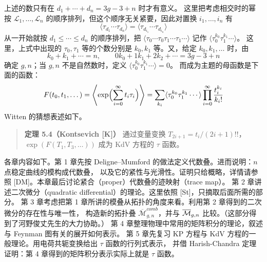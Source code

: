 
上述的数只有在 $d_1+\cdots+d_n=3g-3+n$ 时才有意义。
这里把考虑相交时的幂按 $\mathcal{L}_1,\dots,\mathcal{L}_n$ 的顺序排列，但这个顺序无关紧要，因此对置换 $i_1,\dots,i_n$ 有
\[
\langle\tau_{d_1}\cdots\tau_{d_n}\rangle=\langle\tau_{d_{i_1}}\cdots\tau_{d_{i_n}}\rangle
\]
从一开始就按 $d_1\le\cdots\le d_n$ 的顺序排列，把
$\langle\tau_0\cdots\tau_0\tau_1\cdots\tau_1\cdots\rangle$ 记作 $\langle\tau_0^{k_0}\tau_1^{k_1}\cdots\rangle$。
这里，上式中出现的 $\tau_0,\tau_1$ 等的个数分别是 $k_0,k_1$ 等。又，给定 $k_0,k_1,\dots$ 时，由
\[
k_0+k_1+\cdots=n,\qquad 0k_0+1k_1+2k_2+\cdots=3g-3+n
\]
确定 $g,n$；当 $g,n$ 不是自然数时，定义 $\langle\tau_0^{k_0}\tau_1^{k_1}\cdots\rangle=0$。
而成为主题的母函数是下面的函数：
\[
F(t_0,t_1,\dots)=\left\langle\exp\Bigl(\sum_{i=0}^{\infty}t_i\tau_i\Bigr)\right\rangle
=\sum_{k_i}\langle\tau_0^{k_0}\tau_1^{k_1}\cdots\rangle\prod_{i=0}^{\infty}\frac{t_i^{k_i}}{k_i!}
\]
Witten 的猜想表述如下。

\begin{quote}
\textbf{定理 5.4（Kontsevich [K]）}\quad
通过变量变换 $T_{2i+1}=t_i/(2i+1)!!$，$\exp(F(T_1,T_3,\dots))$ 成为 KdV 方程的 $\tau$ 函数。
\end{quote}


各章内容如下。第 1 章先按 Deligne--Mumford 的做法定义代数叠。进而说明：$n$ 点稳定曲线的模构成代数叠，
以及它的紧性与光滑性。证明只给概略，详情请参照 [DM]。本章最后讨论紧合（proper）代数叠的迹映射（trace map）。
第 2 章讲述二次微分（quadratic differential）的理论。这里依照 [St]，只摘取后面所需的部分。
第 3 章考虑把第 1 章所讲的模叠从拓扑的角度来看。利用第 2 章得到的二次微分的存在性与唯一性，
构造新的拓扑叠 $\overline{\mathcal{M}}_{g,n}^{comb}$，并与 $\overline{\mathcal{M}}_{g,n}$ 比较。（这部分得到了河野俊丈先生的大力协助。）
第 4 章整理物理中常用的矩阵积分的理论，叙述与 Feynman 图有关的展开如何表示。
第 5 章先复习 KP 方程与 KdV 方程的一般理论。用电荷共轭变换给出 $\tau$ 函数的行列式表示，
并借 Harish-Chandra 定理证明：第 4 章得到的矩阵积分表示实际上就是 $\tau$ 函数。


